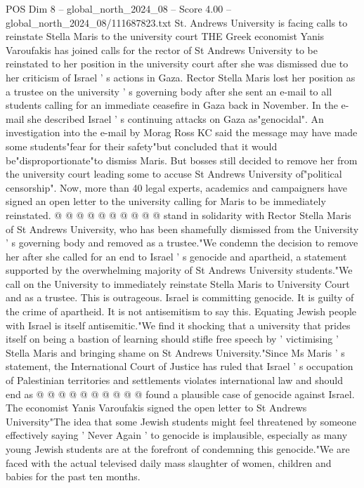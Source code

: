 \begin{textsample}{POS Dim 8 – global\_north\_2024\_08 – Score 4.00 – global\_north\_2024\_08/111687823.txt}  \label{ex:f8_pos_323}
St.
Andrews University is facing calls to reinstate Stella Maris to the university court THE Greek economist Yanis Varoufakis has joined calls for the rector of St Andrews University to be reinstated to her position in the university court after she was dismissed due to her criticism of Israel ' s actions in Gaza.
Rector Stella Maris lost her position as a trustee on the university ' s governing body after she sent an e-mail to all students calling for an immediate ceasefire in Gaza back in November.
In the e-mail she described Israel ' s continuing attacks on Gaza as"genocidal".
An investigation into the e-mail by Morag Ross KC said the message may have made some students"fear for their safety"but concluded that it would be"disproportionate"to dismiss Maris.
But bosses still decided to remove her from the university court leading some to accuse St Andrews University of"political censorship".
Now, more than 40 legal experts, academics and campaigners have signed an open letter to the university calling for Maris to be immediately reinstated. @ @ @ @ @ @ @ @ @ @ stand in solidarity with Rector Stella Maris of St Andrews University, who has been shamefully dismissed from the University ' s governing body and removed as a trustee."We condemn the decision to remove her after she called for an end to Israel ' s genocide and apartheid, a statement supported by the overwhelming majority of St Andrews University students."We call on the University to immediately reinstate Stella Maris to University Court and as a trustee.
This is outrageous.
Israel is committing genocide.
It is guilty of the crime of apartheid.
It is not antisemitism to say this.
Equating Jewish people with Israel is itself antisemitic."We find it shocking that a university that prides itself on being a bastion of learning should stifle free speech by ' victimising ' Stella Maris and bringing shame on St Andrews University."Since Ms Maris ' s statement, the International Court of Justice has ruled that Israel ' s occupation of Palestinian territories and settlements violates international law and should end as @ @ @ @ @ @ @ @ @ @ found a plausible case of genocide against Israel.
The economist Yanis Varoufakis signed the open letter to St Andrews University"The idea that some Jewish students might feel threatened by someone effectively saying ' Never Again ' to genocide is implausible, especially as many young Jewish students are at the forefront of condemning this genocide."We are faced with the actual televised daily mass slaughter of women, children and babies for the past ten months.

\end{textsample}
